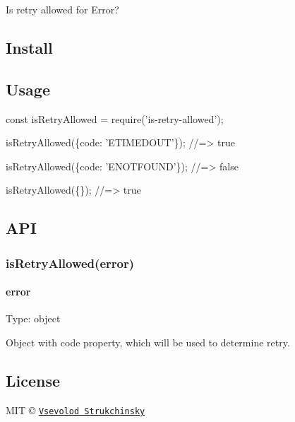 Is retry allowed for Error?

\subsection*{Install}




\subsection*{Usage}


\begin{DoxyCode}
const isRetryAllowed = require('is-retry-allowed');

isRetryAllowed(\{code: 'ETIMEDOUT'\});
//=> true

isRetryAllowed(\{code: 'ENOTFOUND'\});
//=> false

isRetryAllowed(\{\});
//=> true
\end{DoxyCode}


\subsection*{A\+PI}

\subsubsection*{is\+Retry\+Allowed(error)}

\paragraph*{error}

Type\+: {\ttfamily object}

Object with {\ttfamily code} property, which will be used to determine retry.

\subsection*{License}

M\+IT © \href{http://github.com/floatdrop}{\tt Vsevolod Strukchinsky} 